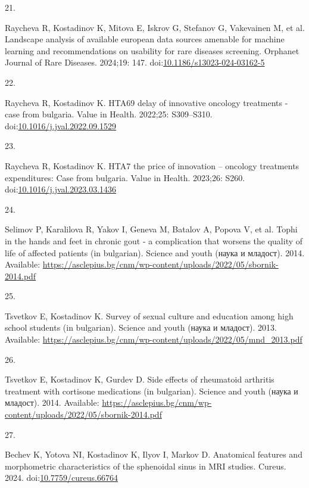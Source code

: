 \documentclass[
  12pt,
  letterpaper,
  DIV=11,
  numbers=noendperiod]{scrartcl}
\newlength{\cslhangindent}
\newlength{\csllabelwidth}
\newenvironment{CSLReferences}[2] %
 {\begin{list}{}{%
  \setlength{\itemindent}{0pt}
  \setlength{\leftmargin}{0pt}
  \setlength{\parsep}{0pt}
  \ifodd #1
   \setlength{\leftmargin}{\cslhangindent}
   \setlength{\itemindent}{-1\cslhangindent}
  \fi
  \setlength{\itemsep}{#2\baselineskip}}}
 {\end{list}}
\newcommand{\CSLLeftMargin}[1]{\parbox[t]{\csllabelwidth}{\strut#1\strut}}
\newcommand{\CSLRightInline}[1]{\parbox[t]{\linewidth - \csllabelwidth}{\strut#1\strut}}
\begin{document}
\begin{CSLReferences}{0}{1}
\CSLLeftMargin{21. }%
\CSLRightInline{Raycheva R, Kostadinov K, Mitova E, Iskrov G, Stefanov
G, Vakevainen M, et al. Landscape analysis of available european data
sources amenable for machine learning and recommendations on usability
for rare diseases screening. Orphanet Journal of Rare Diseases. 2024;19:
147.
doi:\href{https://doi.org/10.1186/s13023-024-03162-5}{10.1186/s13023-024-03162-5}}

\CSLLeftMargin{22. }%
\CSLRightInline{Raycheva R, Kostadinov K. HTA69 delay of innovative
oncology treatments - case from bulgaria. Value in Health. 2022;25:
S309--S310.
doi:\href{https://doi.org/10.1016/j.jval.2022.09.1529}{10.1016/j.jval.2022.09.1529}}

\CSLLeftMargin{23. }%
\CSLRightInline{Raycheva R, Kostadinov K. HTA7 the price of innovation
-- oncology treatments expenditures: Case from bulgaria. Value in
Health. 2023;26: S260.
doi:\href{https://doi.org/10.1016/j.jval.2023.03.1436}{10.1016/j.jval.2023.03.1436}}

\CSLLeftMargin{24. }%
\CSLRightInline{Selimov P, Karalilova R, Yakov I, Geneva M, Batalov A,
Popova V, et al. Tophi in the hands and feet in chronic gout - a
complication that worsens the quality of life of affected patients (in
bulgarian). Science and youth (наука и младост). 2014. Available:
\url{https://asclepius.bg/cnm/wp-content/uploads/2022/05/sbornik-2014.pdf}}

\CSLLeftMargin{25. }%
\CSLRightInline{Tsvetkov E, Kostadinov K. Survey of sexual culture and
education among high school students (in bulgarian). Science and youth
(наука и младост). 2013. Available:
\url{https://asclepius.bg/cnm/wp-content/uploads/2022/05/mnd_2013.pdf}}

\CSLLeftMargin{26. }%
\CSLRightInline{Tsvetkov E, Kostadinov K, Gurdev D. Side effects of
rheumatoid arthritis treatment with cortisone medications (in
bulgarian). Science and youth (наука и младост). 2014. Available:
\url{https://asclepius.bg/cnm/wp-content/uploads/2022/05/sbornik-2014.pdf}}

\CSLLeftMargin{27. }%
\CSLRightInline{Bechev K, Yotova NI, Kostadinov K, Ilyov I, Markov D.
Anatomical features and morphometric characteristics of the sphenoidal
sinus in MRI studies. Cureus. 2024.
doi:\href{https://doi.org/10.7759/cureus.66764}{10.7759/cureus.66764}}

\end{CSLReferences}
\end{document}
